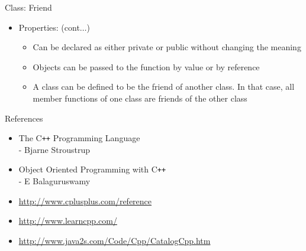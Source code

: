 \documentclass{beamer}
\begin{document}
\begin{frame}[fragile]{Class: Friend}
  \begin{itemize}
  \item Properties: (cont$\dots$)\pause
    \begin{itemize}
      \item Can be declared as either private or public without changing the meaning\pause
      \item Objects can be passed to the function by value or by reference\pause
      \item A class can be defined to be the friend of another class. In that case, all member functions of one class are friends of the other class
    \end{itemize}
  \end{itemize}
\end{frame}

\begin{frame}[fragile]{References}
  \begin{itemize}
    \item The C\texttt{++} Programming Language\\
      - Bjarne Stroustrup
    \item Object Oriented Programming with C\texttt{++}\\
      - E Balaguruswamy
    \item \url{http://www.cplusplus.com/reference}
    \item \url{http://www.learncpp.com/}
    \item \url{http://www.java2s.com/Code/Cpp/CatalogCpp.htm}
  \end{itemize}
\end{frame}
\end{document}
